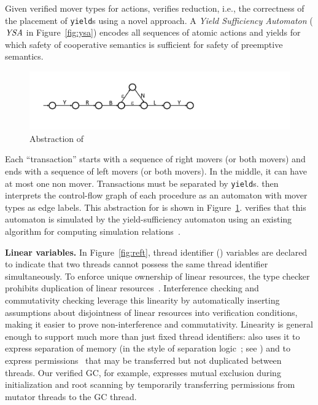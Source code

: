 Given verified mover types for actions, \civl verifies reduction, i.e., the correctness of the placement of {\tt yield}s using a novel  approach.
A {\em Yield Sufficiency Automaton\/} ($\mathit{YSA}$ in Figure~\ref{fig:ysa}) encodes all sequences of atomic actions and yields for which safety of cooperative semantics is sufficient 
for safety of preemptive semantics. 
\begin{figure}
\begin{center}
\includegraphics[scale=0.25]{WBSlow.pdf}
\end{center}
\vspace*{-0.2cm}
\caption{Abstraction of }
\label{fig:midwb}
\end{figure}
Each ``transaction'' starts with a sequence of right movers (or both movers) and ends with a sequence of left movers (or both movers).
In the middle, it can have at most one non mover. Transactions must be
separated by {\tt yield}s.
\civl then interprets the control-flow graph of each procedure as an automaton with mover types as edge labels. 
This abstraction for  is shown in Figure~\ref{fig:midwb}.
\civl verifies that this automaton is simulated by the yield-sufficiency automaton using an existing algorithm for computing simulation relations~\cite{HenzingerHK95}.

{\bf Linear variables.}
In Figure~\ref{fig:reft}, thread identifier () variables are declared  to indicate that two threads cannot possess the same thread identifier simultaneously.
To enforce unique ownership of linear resources, the \civl type checker prohibits duplication of linear resources~\cite{Wadler90lineartypes}.
Interference checking and commutativity checking leverage this linearity by automatically inserting assumptions about disjointness of linear resources into verification conditions,
making it easier to prove non-interference and commutativity.
Linearity is general enough to support much more than just fixed thread identifiers:
\civl also uses it to express separation of memory (in the style of separation logic~\cite{Reynolds02}; see \cite{LahiriQW11})
and to express permissions~\cite{boyland:03fractions} that may be transferred but not duplicated between threads.
Our verified GC, for example, expresses mutual exclusion during initialization and root scanning by temporarily transferring permissions from mutator threads to the GC thread.

